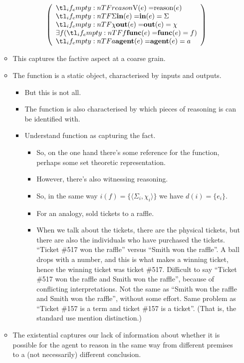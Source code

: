 \documentclass[10pt]{article}
\begin{document}
\begin{itemize}
\begin{itemize}
\[      \left(
        \begin{array}{l}
          \everb{reason} \\
          \ein{\Sigma} \\
          \eout{\chi} \\
          \exists f(\efunc{f}) \\
          \eagentm{a}
        \end{array}
      \right)
    \]
  \item This captures the factive aspect at a coarse grain.
  \item The function is a static object, characterised by inputs and outputs.
    \begin{itemize}
    \item But this is not all.
    \item The function is also characterised by which pieces of reasoning is can be identified with.
    \item Understand function as capturing the fact.
      \begin{itemize}
      \item So, on the one hand there's some reference for the function, perhaps some set theoretic representation.
      \item However, there's also witnessing reasoning.
      \item {\color{red} So}, in the same way \(i(f) = \{ \langle \Sigma_{i}, \chi_{i} \rangle \}\) we have \(d(i) = \{ e_{i} \}\).
      \item For an analogy, sold tickets to a raffle.
      \item When we talk about the tickets, there are the physical tickets, but there are also the individuals who have purchased the tickets.
        ``Ticket \#517 won the raffle'' versus ``Smith won the raffle''.
        A ball drops with a number, and this is what makes a winning ticket, hence the winning ticket was ticket \#517.
        Difficult to say ``Ticket \#517 won the raffle and Smith won the raffle'', because of conflicting interpretations.
        Not the same as ``Smith won the raffle and Smith won the raffle'', without some effort.
        Same problem as ``Ticket \#157 is a term and ticket \#157 is a ticket''.
        (That is, the standard use mention distinction.)
      \end{itemize}
    \end{itemize}
  \item The existential captures our lack of information about whether it is possible for the agent to reason in the same way from different premises to a (not necessarily) different conclusion.


\end{itemize}
\end{itemize}
\end{document}
